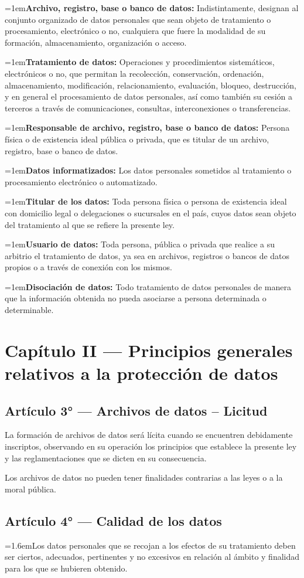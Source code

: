 \documentclass[10pt,a4paper]{article}
\newcommand{\articulo}[1]{\subsection{#1}}
\newcommand{\inciso}[2]{\par{\hangindent=1.6em\hangafter=1\makebox[1.6em][l]{#1}#2\par}}
\newcommand{\definicion}[2]{\par{\hangindent=1em\hangafter=1\makebox[1em][l]{--}\textbf{#1:} #2\par}}
\begin{document}
\definicion{Archivo, registro, base o banco de datos}{Indistintamente, designan al conjunto organizado de datos personales que sean objeto de tratamiento o procesamiento, electrónico o no, cualquiera que fuere la modalidad de su formación, almacenamiento, organización o acceso.}

\definicion{Tratamiento de datos}{Operaciones y procedimientos sistemáticos, electrónicos o no, que permitan la recolección, conservación, ordenación, almacenamiento, modificación, relacionamiento, evaluación, bloqueo, destrucción, y en general el procesamiento de datos personales, así como también su cesión a terceros a través de comunicaciones, consultas, interconexiones o transferencias.}

\definicion{Responsable de archivo, registro, base o banco de datos}{Persona física o de existencia ideal pública o privada, que es titular de un archivo, registro, base o banco de datos.}

\definicion{Datos informatizados}{Los datos personales sometidos al tratamiento o procesamiento electrónico o automatizado.}

\definicion{Titular de los datos}{Toda persona física o persona de existencia ideal con domicilio legal o delegaciones o sucursales en el país, cuyos datos sean objeto del tratamiento al que se refiere la presente ley.}

\definicion{Usuario de datos}{Toda persona, pública o privada que realice a su arbitrio el tratamiento de datos, ya sea en archivos, registros o bancos de datos propios o a través de conexión con los mismos.}

\definicion{Disociación de datos}{Todo tratamiento de datos personales de manera que la información obtenida no pueda asociarse a persona determinada o determinable.}

\section{Capítulo II --- Principios generales relativos a la protección de datos}
\articulo{Artículo 3° --- Archivos de datos – Licitud}
La formación de archivos de datos será lícita cuando se encuentren debidamente inscriptos, observando en su operación los principios que establece la presente ley y las reglamentaciones que se dicten en su consecuencia.

Los archivos de datos no pueden tener finalidades contrarias a las leyes o a la moral pública.

\articulo{Artículo 4° --- Calidad de los datos}
\inciso{1.}{Los datos personales que se recojan a los efectos de su tratamiento deben ser ciertos, adecuados, pertinentes y no excesivos en relación al ámbito y finalidad para los que se hubieren obtenido.}
\end{document}
